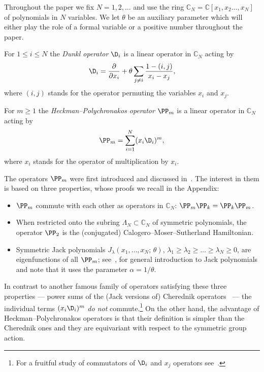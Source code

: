 Throughout the paper we fix $N=1,2,\dots$ and use the ring $\mathbb C_N=\mathbb C[x_1,x_2\dots,x_N]$ of polynomials in $N$ variables.  We let $\theta$ be an auxiliary parameter which will either play the
role of a formal variable or a positive number throughout the paper.
\begin{defi} \label{Definition_Dunkl}
 For $1\le i\le N$ the \emph{Dunkl operator} $\D_i$ is a linear operator in $\mathbb C_N$ acting by
 \begin{equation}
 \D_i= \frac{\partial}{\partial x_i}+\theta \sum_{j\ne i} \frac{1-(i,j)}{x_i-x_j},
 \end{equation}
 where $(i,j)$ stands for the operator permuting the variables $x_i$ and $x_j$.
\end{defi}
\begin{defi} \label{Definition_HP_operator}
 For $m\ge 1$ the \emph{Heckman--Polychronakos operator} $\PP_m$ is a linear operator in $\mathbb C_N$ acting by
 \begin{equation}
 \PP_m= \sum_{i=1}^N (x_i \D_i)^m,
 \end{equation}
 where $x_i$ stands for the operator of multiplication by $x_i$.
\end{defi}

The operators $\PP_m$ were first introduced and discussed in~\cite{heckman1991elementary,polychronakos1992exchange}. The interest in them is based on three properties, whose proofs we recall in the Appendix:
\begin{itemize}
\item $\PP_m$ commute with each other as operators in $\mathbb C_N$:  $\PP_m \PP_k=\PP_k\PP_m$.
\item When restricted onto the subring $\Lambda_N\subset \mathbb C_N$ of symmetric polynomials, the operator $\PP_2$ is the (conjugated) Calogero--Moser--Sutherland Hamiltonian.
\item Symmetric Jack polynomials $J_\lambda(x_1,\dots,x_N;\, \theta)$, $\lambda_1\ge\lambda_2\ge \dots\ge \lambda_N\ge 0$, are eigenfunctions of all $\PP_m$; see~\cite{stanley1989some}, \cite[Chapter VI]{macdonald1998symmetric} for general introduction to Jack polynomials and note that it uses the parameter $\alpha=1/\theta$.
\end{itemize}


In contrast to another famous family of operators satisfying these three properties --- power sums of the (Jack versions of) Cherednik operators~\cite{cherednik1991unification,cherednik1994integration} --- the individual terms $(x_i \D_i)^m$ \emph{do not} commute.\footnote{For a fruitful study of commutators of $\D_i$ and $x_j$ operators see~\cite{feigin2015dunkl}.} On the other hand, the advantage of Heckman--Polychronakos operators is that their definition is simpler than the Cherednik ones and they are equivariant with respect to the symmetric group action.

